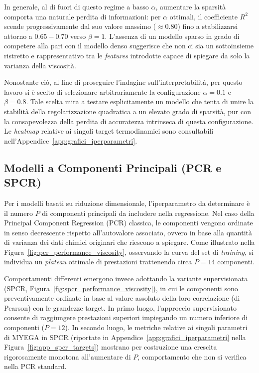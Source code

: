 \documentclass[../main.tex]{subfiles}
\begin{document}
	In generale, al di fuori di questo regime a basso $\alpha$, aumentare la sparsità comporta una naturale perdita di informazioni: per $\alpha$ ottimali, il coefficiente $R^2$ scende progressivamente dal suo valore massimo ($\approx 0.80$) fino a stabilizzarsi attorno a $0.65-0.70$ verso $\beta = 1$. L'assenza di un modello sparso in grado di competere alla pari con il modello denso suggerisce che non ci sia un sottoinsieme ristretto e rappresentativo tra le \textit{features} introdotte capace di spiegare da solo la varianza della viscosità.
	
	Nonostante ciò, al fine di proseguire l'indagine sull'interpretabilità, per questo lavoro si è scelto di selezionare arbitrariamente la configurazione $\alpha = 0.1$ e $\beta = 0.8$. Tale scelta mira a testare esplicitamente un modello che tenta di unire la stabilità della regolarizzazione quadratica a un elevato grado di sparsità, pur con la consapevolezza della perdita di accuratezza intrinseca di questa configurazione. Le \textit{heatmap} relative ai singoli target termodinamici sono consultabili nell'Appendice~\ref{app:grafici_iperparametri}.
		
	
	\subsection{Modelli a Componenti Principali (PCR e SPCR)}
	
	Per i modelli basati su riduzione dimensionale, l'iperparametro da determinare è il numero $P$ di componenti principali da includere nella regressione. 
	Nel caso della Principal Component Regression (PCR) classica, le componenti vengono ordinate in senso decrescente rispetto all'autovalore associato, ovvero in base alla quantità di varianza dei dati chimici originari che riescono a spiegare. Come illustrato nella Figura~\ref{fig:pcr_performance_viscosity}, osservando la curva del set di \textit{training}, si individua un \textit{plateau} ottimale di prestazioni trattenendo circa $P=14$ componenti.
	
	Comportamenti differenti emergono invece adottando la variante supervisionata (SPCR, Figura~\ref{fig:spcr_performance_viscosity}), in cui le componenti sono preventivamente ordinate in base al valore assoluto della loro correlazione (di Pearson) con le grandezze target. In primo luogo, l'approccio supervisionato consente di raggiungere prestazioni superiori impiegando un numero inferiore di componenti ($P=12$). In secondo luogo, le metriche relative ai singoli parametri di MYEGA in SPCR (riportate in Appendice~\ref{app:grafici_iperparametri} nella Figura~\ref{fig:app_spcr_targets}) mostrano per costruzione una crescita rigorosamente monotona all'aumentare di $P$, comportamento che non si verifica nella PCR standard.
	
\end{document}
